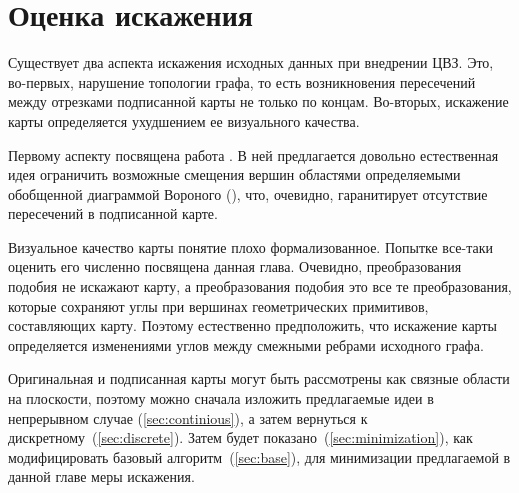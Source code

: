 \chapter{Оценка искажения}

Существует два аспекта искажения исходных данных при внедрении ЦВЗ. Это, во-первых, нарушение топологии графа,
то есть возникновения пересечений между отрезками подписанной карты не только по концам. Во-вторых, искажение
карты определяется ухудшением ее визуального качества.

Первому аспекту посвящена работа \cite{Huber}. В ней предлагается довольно естественная идея ограничить 
возможные смещения вершин областями определяемыми обобщенной диаграммой Вороного (\cite{Held}), что, очевидно,
гаранитирует отсутствие пересечений в подписанной карте.

Визуальное качество карты понятие плохо формализованное. Попытке все-таки оценить его численно посвящена данная
глава. Очевидно, преобразования подобия не искажают карту, а преобразования подобия это все те преобразования, 
которые сохраняют углы при вершинах геометрических 
примитивов, составляющих карту. Поэтому естественно предположить, что искажение карты определяется изменениями
углов между смежными ребрами исходного графа.

Оригинальная и подписанная карты могут быть рассмотрены как связные области на плоскости, поэтому можно сначала
изложить предлагаемые идеи в непрерывном случае (\ref{sec:continious}), а затем вернуться к 
дискретному~(\ref{sec:discrete}). Затем будет показано~(\ref{sec:minimization}), как модифицировать 
базовый алгоритм~(\ref{sec:base}), для минимизации предлагаемой в данной главе меры искажения.




